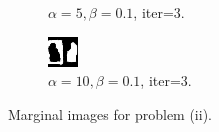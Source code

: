 \documentclass{article}
\begin{document}
\begin{figure}[t]
\begin{subfigure}[t]{0.27\textwidth}
  \vspace{-0.6cm}
  \caption{$\alpha=5, \beta=0.1$, iter=$3$.}
\end{subfigure}
\begin{subfigure}[t]{0.27\textwidth}
  \centering
  \includegraphics[width=\textwidth]{ii_alpha_10_beta_0.1_iterations_4.bmp}
  \vspace{-0.6cm}
  \caption{$\alpha=10, \beta=0.1$, iter=$3$.}
\end{subfigure}
\vspace{-0.3cm}
\caption{Marginal images for problem (ii).}
\label{f:denoise_ii}
\end{figure}
\\
\end{document}
